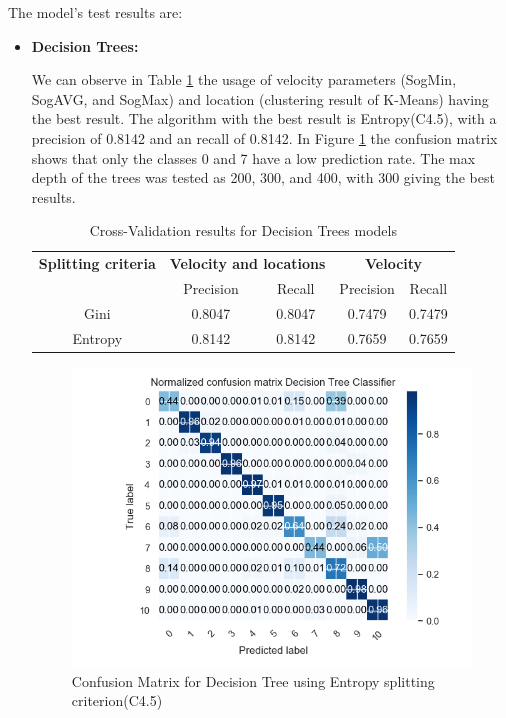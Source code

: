 The model's test results are:
\newpage

\begin{itemize}
\item \textbf{ Decision Trees: }

We can observe in Table \ref{table:cross_val_dt} the usage of velocity parameters (SogMin, SogAVG, and SogMax) and location (clustering result of K-Means) having the best result. The algorithm with the best result is Entropy(C4.5), with a precision of 0.8142 and an recall of 0.8142. In Figure \ref{table:cross_val_dt} the confusion matrix shows that only the classes 0 and 7 have a low prediction rate. The max depth of the trees was tested as 200, 300, and 400, with 300 giving the best results.


\begin {table}[H]
\caption {Cross-Validation results for Decision Trees models}
\begin{center}
\begin{tabular}{c|c|c|c|c}
\multicolumn{1}{c|}{\textbf{Splitting criteria } } &\multicolumn{2}{c|}{\textbf{ Velocity and locations}}& \multicolumn{2}{c}{\textbf{ Velocity}}\\
&Precision & Recall & Precision & Recall \\
\hline
Gini & 0.8047& 0.8047&0.7479&0.7479\\
Entropy& 0.8142& 0.8142&0.7659&0.7659
\label{table:cross_val_dt}
\end{tabular}
\end{center}
\end {table}

\begin{figure}[H]
\centering
\includegraphics[width=0.8\linewidth]{Chapters/img/CM_DT.png}
\caption{Confusion Matrix for Decision Tree using Entropy splitting criterion(C4.5)}
\label{fig:cm_dt}
\end{figure}



\end{itemize}
